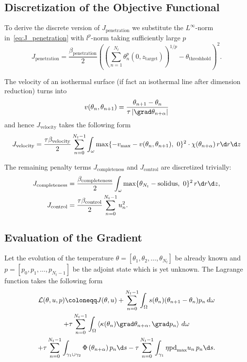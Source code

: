 \subsection{Discretization of the Objective Functional}


To derive the discrete version of $J_\text{penetration}$ we substitute the $L^{\infty}$-norm in~\eqref{eq:J_penetration} with $l^p$-norm taking sufficiently large $p$
\begin{equation}
	J_{\text{penetration}} = \frac{\beta_\text{penetration}}{2}
	\left(
		\left( \sum_{n=1}^{N_t} \theta_n^p (0, z_\text{target}) \right)^{1/p} - \theta_\text{threshhold}
	\right)^2.
\end{equation}

The velocity of an isothermal surface (if fact an isothermal line after dimension reduction) turns into
\begin{equation}
	v(\theta_n, \theta_{n+1}) = \frac{\theta_{n+1}-\theta_n}{\tau \left|\grad \theta_{n+\alpha} \right|}
\end{equation}
and hence $J_\text{velocity}$ takes the following form
\begin{equation}
	J_\text{velocity} =
	\frac{\tau \beta_\text{velocity}}{2}
	\sum_{n=0}^{N_t-1} \int_{\omega} \max \{ - v_{\max} - v(\theta_n, \theta_{n+1}),\ 0 \}^2 \cdot \chi(\theta_{n+\alpha})\, r\d r\d z\, \\
\end{equation}

The remaining penalty terms $J_\text{completeness}$ and $J_\text{control}$ are discretized trivially:
\begin{align}
	J_\text{completeness} 
	&
	=
	\frac{\beta_\text{completeness}}{2} \int_{\omega} \max\{ \theta_{N_t} - \text{solidus},\ 0 \}^2\, r\d r\d z, 
	\\
	J_{\text{control}} 
	&
	=
	\frac{\tau \beta_\text{control}}{2} \sum_{n=0}^{N_t-1} u_n^2.
\end{align}


\subsection{Evaluation of the Gradient}


Let the evolution of the temperature $\theta = [\theta_1, \theta_2, \ldots, \theta_{N_t}]$ be already known and $p = [p_0, p_1, \ldots, p_{N_t-1}]$ be the adjoint state which is yet unknown.
The Lagrange function takes the following form
\begin{multline} \label{eq:lagrange}
	\mathcal{L}(\theta,u,p) \coloneqq
	J(\theta,u)
	+
	\sum_{n=0}^{N_t-1}\int_{\Omega}
		s(\theta_n) (\theta_{n+1}-\theta_n) p_n\, d\omega \\
	+ \tau
	\sum_{n=0}^{N_t-1}\int_{\Omega}
		\left\langle \kappa(\theta_n) \grad \theta_{n+\alpha}, \grad p_n \right\rangle\, d\omega \\
	+ \tau
	\sum_{n=0}^{N_t-1}\int_{\gamma_1 \cup \gamma_2}
		\Phi \left( \theta_{n+\alpha} \right) p_n\d s
	- \tau
	\sum_{n=0}^{N_t-1}\int_{\gamma_1}
		\eta \text{pd}_{\max} u_n\, p_n\d s.
\end{multline}

